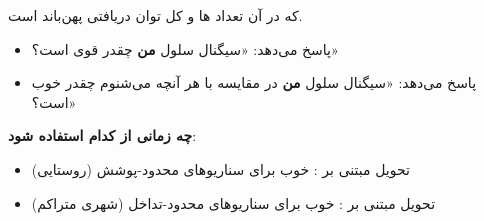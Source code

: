 


که در آن  تعداد ها و  کل توان دریافتی پهن‌باند است.

\begin{itemize}
\tightlist
\item
   پاسخ می‌دهد: «سیگنال سلول \textbf{من} چقدر قوی است؟»
\item
   پاسخ می‌دهد: «سیگنال سلول \textbf{من} در مقایسه با هر آنچه می‌شنوم چقدر خوب است؟»
\end{itemize}

\textbf{چه زمانی از کدام استفاده شود}:

\begin{itemize}
\tightlist
\item
  تحویل مبتنی بر : خوب برای سناریوهای محدود-پوشش (روستایی)
\item
  تحویل مبتنی بر : خوب برای سناریوهای محدود-تداخل (شهری متراکم)
\end{itemize}




\CNchained{}

